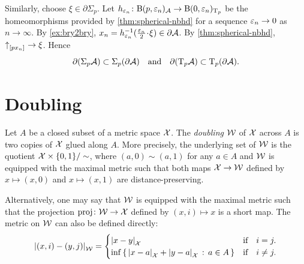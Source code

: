 Similarly, choose $\xi\in\partial\Sigma_p$.
Let $h_{\varepsilon_n}\colon\mathrm{B}{}(p,\varepsilon_n)_{\mathcal{A}}\to \mathrm{B}{}(0,\varepsilon_n)_{\mathrm{T}_p}$ be the homeomorphisms provided by \ref{thm:spherical-nbhd} for a sequence $\varepsilon_n\to 0$ as $n\to\infty$.
By \ref{ex:bry2bry}, $x_n=h_{\eps_n}^{-1}(\tfrac{\eps_n}2\cdot\xi)\in \partial \spc{A}$.
By \ref{thm:spherical-nbhd}, ${\uparrow}_{[{p}{x_n}]_{{}}}\to \xi$.
Hence
\[\partial (\Sigma_p\mathcal{A})\subset\Sigma_p(\partial\mathcal{A})
\quad\text{and}\quad\partial(\mathrm{T}_p\mathcal{A})\subset\mathrm{T}_p(\partial\mathcal{A}).\]
\qedsf

\section{Doubling}

Let $A$ be a closed subset of a metric space $\mathcal{X}$.
The \emph{doubling} $\mathcal{W}$ of $\mathcal{X}$ across $A$ is two copies of $\mathcal{X}$ glued along $A$.
More precisely, the underlying set of $\mathcal{W}$ is the quotient $\mathcal{X}\times\{0,1\}/\sim$, where $(a,0)\sim (a,1)$ for any $a\in A$ and $\mathcal{W}$ is equipped with the maximal metric such that both maps $\mathcal{X}\to \mathcal{W}$ defined by $x\mapsto (x,0)$ and $x\mapsto (x,1)$ are distance-preserving.

Alternatively, one may say that $\mathcal{W}$ is equipped with the maximal metric such that the projection $\operatorname{\rm proj}\nolimits\colon\mathcal{W}\to\mathcal{X}$ defined by $(x,i)\mapsto x$ is a short map.
The metric on $\mathcal{W}$ can also be defined directly:
\[\dist{(x,i)}{(y,j)}{\spc{W}}=
\begin{cases}
\dist{x}{y}{\spc{X}}&\text{if}\quad i= j.
\\
\inf\set{\dist{x}{a}{\spc{X}}+\dist{y}{a}{\spc{X}}}{a\in A}&\text{if}\quad i\ne j.
\end{cases}
\]

